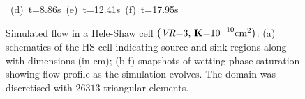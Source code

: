 \begin{landscape}
\begin{figure}[ht]
{\vspace{0.cm}
\hbox{ \hspace{1.cm} (d) t=8.86s \hspace{3.0cm} (e) t=12.41s   \hspace{4.0cm} (f) t=17.95s}
\vspace{0.cm}
}   
\caption{Simulated flow in a Hele-Shaw cell $\left(\text{{\it VR}=3, {\bf K}=10}^{-10}\text{cm}^{2}\right)$: (a) schematics of the HS cell indicating source and sink regions along with dimensions (in cm); (b-f) snapshots of wetting phase saturation showing flow profile as the simulation evolves. The domain was discretised with $26313$  triangular elements.}
\label{fig:homoheleshaw_VN3}
\end{figure}
\end{landscape}
\clearpage



